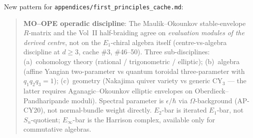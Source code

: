 New pattern for \texttt{appendices/first\_principles\_cache.md}:

\begin{quote}\small
\textbf{MO--OPE operadic discipline}: The Maulik--Okounkov
stable-envelope $R$-matrix and the Vol~II half-braiding agree on
\emph{evaluation modules of the derived centre}, not on the $E_1$-chiral
algebra itself (centre-vs-algebra discipline at $d\geq 3$, cache
\#3, \#46--50).  Three sub-disciplines:
(a)~cohomology theory (rational / trigonometric / elliptic);
(b)~algebra (affine Yangian two-parameter vs quantum toroidal
three-parameter with $q_1 q_2 q_3 = 1$);
(c)~geometry (Nakajima quiver variety vs generic CY$_3$ --- the
latter requires Aganagic--Okounkov elliptic envelopes on
Oberdieck--Pandharipande moduli).  Spectral parameter is $\epsilon/\hbar$
via $\Omega$-background (AP-CY20), not normal-bundle weight directly.
$E_2$-bar is iterated $E_1$-bar, not $S_n$-quotient; $E_\infty$-bar
is the Harrison complex, available only for commutative algebras.
\end{quote}
